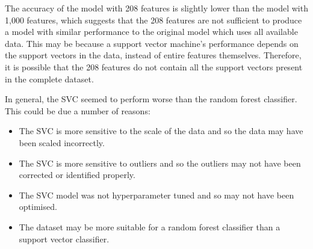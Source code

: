 \documentclass{article}
\begin{document}
\begin{enumerate}[label=\alph*)]
    The accuracy of the model with 208 features is slightly lower than the model with 1,000 features, which suggests that the 208 features are not sufficient to produce a model with similar performance to the original model which uses all available data. This may be because a support vector machine's performance depends on the support vectors in the data, instead of entire features themselves. Therefore, it is possible that the 208 features do not contain all the support vectors present in the complete dataset.

    In general, the SVC seemed to perform worse than the random forest classifier. This could be due a number of reasons:
    \begin{itemize}
        \item The SVC is more sensitive to the scale of the data and so the data may have been scaled incorrectly.
        \item The SVC is more sensitive to outliers and so the outliers may not have been corrected or identified properly.
        \item The SVC model was not hyperparameter tuned and so may not have been optimised.
        \item The dataset may be more suitable for a random forest classifier than a support vector classifier.
    \end{itemize}
\end{enumerate}

\newpage
\end{document}
